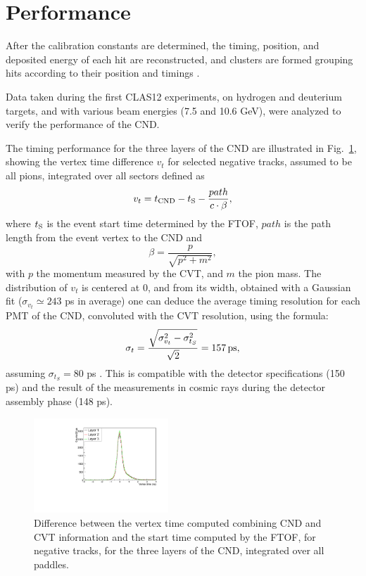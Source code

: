 \section{Performance}
After the calibration constants are determined, the timing, position, and deposited energy of each hit are reconstructed, and clusters are formed grouping hits according to their position and timings \cite{recon-nim}.

Data taken during the first CLAS12 experiments, on hydrogen and deuterium targets, and with various beam energies (7.5 and 10.6 GeV), were analyzed to verify the performance of the CND. 

The timing performance for the three layers of the CND are illustrated in Fig.~\ref{fig_performance_deltat_layers}, showing the vertex time difference $v_t$ for selected negative tracks, assumed to be all pions, integrated over all sectors defined as
\begin{equation}\label{eq_vtp_definition}
v_t=t_{\rm{CND}}-t_{\rm{S}}-\frac{path}{c \cdot \beta} ,
\end{equation}
where $t_{\rm{S}}$ is the event start time determined by the FTOF, $path$ is the path length from the event vertex to the CND and
\begin{equation}\label{eq_beta_definition}
  \beta=\frac{p}{\sqrt{p^2+m^2}},
\end{equation}
with $p$ the momentum measured by the CVT, and $m$ the pion mass. 
The distribution of $v_t$ is centered at 0, and from its width, obtained with a Gaussian fit ($\sigma_{v_t}\simeq 243$ ps in average) one can deduce the average timing resolution for each PMT of the CND, convoluted with the CVT resolution, using the formula:
\begin{equation}\label{eq_resolution}
\sigma_t=\frac{\sqrt{\sigma_{v_t}^2-\sigma_{t_{S}}^2}}{\sqrt{2}}=157\, \rm{ps}, 
\end{equation}
assuming $\sigma_{t_{S}}=80$ ps \cite{ftof-nim}. This is compatible with the detector specifications (150 ps) and the result of the measurements in cosmic rays during the detector assembly phase \cite{Niccolai:2018qzm} (148 ps).

\begin{figure}[htb]  
\begin{center}
\includegraphics[width=0.45\textwidth]{Figure/canVTPlot.pdf}
\caption {Difference between the vertex time computed combining CND and CVT information and the start time computed by the FTOF, for negative tracks, for the three layers of the CND, integrated over all paddles. }
\label{fig_performance_deltat_layers}
\end{center}
\end{figure}

